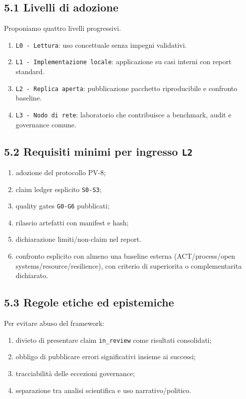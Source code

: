 \subsection{5.1 Livelli di adozione}

Proponiamo quattro livelli progressivi.

\begin{enumerate}
\def\labelenumi{\arabic{enumi}.}
\tightlist
\item
  \texttt{L0\ -\ Lettura}: uso concettuale senza impegni validativi.
\item
  \texttt{L1\ -\ Implementazione\ locale}: applicazione su casi interni con report standard.
\item
  \texttt{L2\ -\ Replica\ aperta}: pubblicazione pacchetto riproducibile e confronto baseline.
\item
  \texttt{L3\ -\ Nodo\ di\ rete}: laboratorio che contribuisce a benchmark, audit e governance comune.
\end{enumerate}

\subsection{\texorpdfstring{5.2 Requisiti minimi per ingresso \texttt{L2}}{5.2 Requisiti minimi per ingresso L2}}

\begin{enumerate}
\def\labelenumi{\arabic{enumi}.}
\tightlist
\item
  adozione del protocollo PV-8;
\item
  claim ledger esplicito \texttt{S0-S3};
\item
  quality gates \texttt{G0-G6} pubblicati;
\item
  rilascio artefatti con manifest e hash;
\item
  dichiarazione limiti/non-claim nel report.
\item
  confronto esplicito con almeno una baseline esterna (ACT/process/open systems/resource/resilience), con criterio di superiorita o complementarita dichiarato.
\end{enumerate}

\subsection{5.3 Regole etiche ed epistemiche}

Per evitare abuso del framework:

\begin{enumerate}
\def\labelenumi{\arabic{enumi}.}
\tightlist
\item
  divieto di presentare claim \texttt{in\_review} come risultati consolidati;
\item
  obbligo di pubblicare errori significativi insieme ai successi;
\item
  tracciabilità delle eccezioni governance;
\item
  separazione tra analisi scientifica e uso narrativo/politico.
\end{enumerate}

